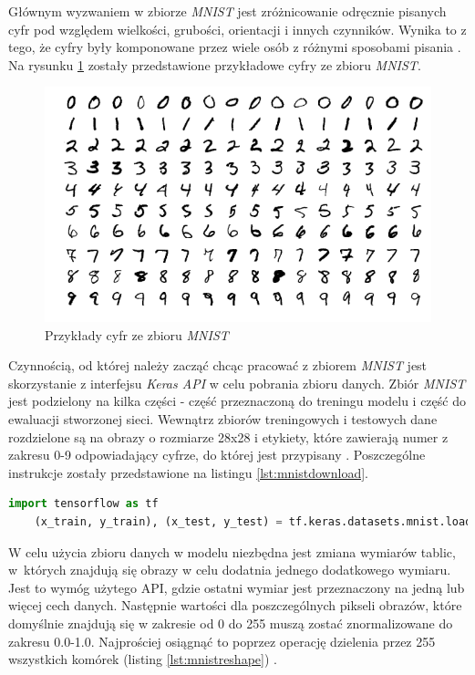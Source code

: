 \documentclass[a4paper,12pt,oneside]{book} %
\begin{document}
Głównym wyzwaniem w zbiorze \emph{MNIST} jest zróżnicowanie odręcznie pisanych cyfr pod względem wielkości, grubości, orientacji i innych czynników. Wynika to z tego, że cyfry były komponowane przez wiele osób z różnymi sposobami pisania \cite{9388351}.
Na rysunku \ref{mnistimg} zostały przedstawione przykładowe cyfry ze zbioru \emph{MNIST}.
\begin{figure}[h]
	\centering
	\includegraphics[scale=0.6]{mnistimg.png}
	\caption{Przykłady cyfr ze zbioru \emph{MNIST} \cite{mnistwik}}
	\label{mnistimg}
\end{figure}
Czynnością, od której należy zacząć chcąc pracować z zbiorem \emph{MNIST} jest skorzystanie z interfejsu \emph{Keras API} w celu pobrania zbioru danych. Zbiór \emph{MNIST} jest podzielony na kilka części - część przeznaczoną do treningu modelu i część do ewaluacji stworzonej sieci. Wewnątrz zbiorów treningowych i testowych dane rozdzielone są na obrazy o rozmiarze 28x28 i etykiety, które zawierają numer z zakresu 0-9 odpowiadający cyfrze, do której jest przypisany \cite{mnistapp}. Poszczególne instrukcje zostały przedstawione na listingu \ref{lst:mnistdownload}.

\begin{lstlisting}[language=Python, caption={Pobieranie zbioru \emph{MNIST} \cite{mnistapp}}, label={lst:mnistdownload}]
	import tensorflow as tf
	(x_train, y_train), (x_test, y_test) = tf.keras.datasets.mnist.load_data()
\end{lstlisting}

W celu użycia zbioru danych w modelu niezbędna jest zmiana wymiarów tablic, w~których znajdują się obrazy w celu dodatnia jednego dodatkowego wymiaru. Jest to wymóg użytego API, gdzie ostatni wymiar jest przeznaczony na jedną lub więcej cech danych. Następnie wartości dla poszczególnych pikseli obrazów, które domyślnie znajdują się w zakresie od 0 do 255 muszą zostać znormalizowane do zakresu 0.0-1.0. Najprościej osiągnąć to poprzez operację dzielenia przez 255 wszystkich komórek (listing \ref{lst:mnistreshape}) \cite{mnistapp}.
\end{document}
